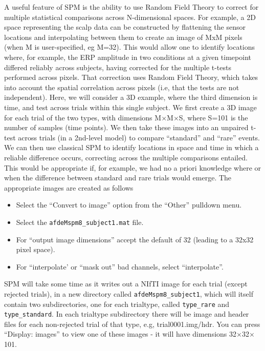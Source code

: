 A useful feature of SPM is the ability to use Random Field Theory to correct for multiple statistical comparisons across N-dimensional spaces. For example, a 2D space representing the scalp data can be constructed by flattening the sensor locations and interpolating between them to create an image of MxM pixels (when M is user-specified, eg M=32). This would allow one to identify locations where, for example, the ERP amplitude in two conditions at a given timepoint differed reliably across subjects, having corrected for the multiple t-tests performed across pixels. That correction uses Random Field Theory, which takes into account the spatial correlation across pixels (i.e, that the tests are not independent). 
Here, we will consider a 3D example, where the third dimension is time, and test across trials within this single subject. We first create a 3D image for each trial of the two types, with dimensions M$\times$M$\times$S, where S=101 is the number of samples (time points). We then take these images into an unpaired t-test across trials (in a 2nd-level model) to compare ``standard'' and ``rare'' events. We can then use classical SPM to identify locations in space and time in which a reliable difference occurs, correcting across the multiple comparisons entailed. This would be appropriate if, for example, we had no a priori knowledge where or when the difference between standard and rare trials would emerge. The appropriate images are created as follows
\begin{itemize}
\item{Select the ``Convert to image'' option from the ``Other'' pulldown menu.}
\item{Select the \texttt{afdeMspm8\_subject1.mat} file.}
\item{For ``output image dimensions'' accept the default of 32 (leading to a 32x32 pixel space).}
\item{For ``interpolate' or ``mask out'' bad channels, select ``interpolate''.}
\end{itemize}
SPM will take some time as it writes out a NIfTI image for each trial (except rejected trials), in a new directory called \texttt{afdeMspm8\_subject1}, which will itself contain two subdirectories, one for each trialtype, called \texttt{type\_rare} and \texttt{type\_standard}. In each trialtype subdirectory there will be image and header files for each non-rejected trial of that type, e.g, trial0001.img/hdr. You can press ``Display: images'' to view one of these images - it will have dimensions 32$\times$32$\times$101.

